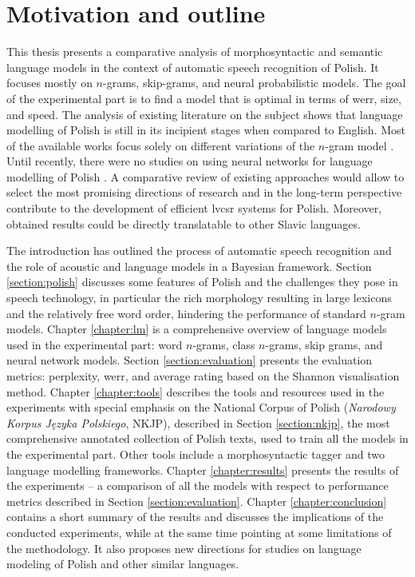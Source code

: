 \FloatBarrier
\section{Motivation and outline}
\label{section:outline}
This thesis presents a comparative analysis of morphosyntactic and semantic language models in the context of automatic speech recognition of Polish. It focuses mostly on $n$-grams, skip-grams, and neural probabilistic models. The goal of the experimental part is to find a model that is optimal in terms of \gls{werr}, size, and speed. The analysis of existing literature on the subject shows that language modelling of Polish is still in its incipient stages when compared to English. Most of the available works focus solely on different variations of the $n$-gram model \cite{majewski2008syllable, ziolko2011n}. Until recently, there were no studies on using neural networks for language modelling of Polish \cite{gajecki2013modelowanie, brocki2012connectionist}. A comparative review of existing approaches would allow to select the most promising directions of research and in the long-term perspective contribute to the development of efficient \gls{lvcsr} systems for Polish. Moreover, obtained results could be directly translatable to other Slavic languages.

The introduction has outlined the process of automatic speech recognition and the role of acoustic and language models in a Bayesian framework. Section \ref{section:polish} discusses some features of Polish and the challenges they pose in speech technology, in particular the rich morphology resulting in large lexicons and the relatively free word order, hindering the performance of standard $n$-gram models. 
Chapter \ref{chapter:lm} is a comprehensive overview of language models used in the experimental part: word $n$-grams, class $n$-grams, skip grams, and neural network models. Section \ref{section:evaluation} presents the evaluation metrics: perplexity, \gls{werr}, and average rating based on the Shannon visualisation method.
Chapter \ref{chapter:tools} describes the tools and resources used in the experiments with special emphasis on the National Corpus of Polish (\textit{Narodowy Korpus Języka Polskiego}, NKJP), described in Section \ref{section:nkjp}, the most comprehensive annotated collection of Polish texts, used to train all the models in the experimental part. Other tools include a morphosyntactic tagger and two language modelling frameworks.
Chapter \ref{chapter:results} presents the results of the experiments -- a comparison of all the models with respect to performance metrics described in Section \ref{section:evaluation}.
Chapter \ref{chapter:conclusion} contains a short summary of the results and discusses the implications of the conducted experiments, while at the same time pointing at some limitations of the methodology. It also proposes new directions for studies on language modeling of Polish and other similar languages.
